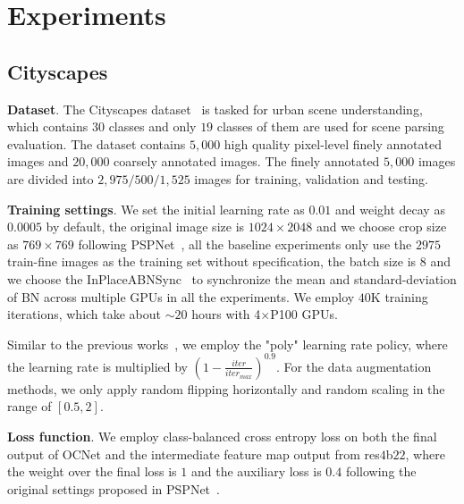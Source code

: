 \documentclass[10pt,twocolumn,letterpaper]{article}
\begin{document}
\section{Experiments}
\subsection{Cityscapes}

\noindent\textbf{Dataset}.
The Cityscapes dataset~\cite{cordts2016cityscapes} is tasked for urban scene understanding, which contains $30$ classes and only $19$ classes of them are used for scene parsing evaluation.
The dataset contains $5,000$ high quality pixel-level finely annotated images and $20,000$ coarsely annotated images. The finely annotated $5,000$ images are divided into $2,975/500/1,525$ images for training, validation and testing. 

\vspace{0.1cm}
\noindent\textbf{Training settings}.
We set the initial learning rate as $0.01$ and weight decay as $0.0005$ by default, the original image size is $1024\times 2048$ and we choose crop size as $769\times 769$ following PSPNet~\cite{zhao2017pyramid}, all the baseline experiments only use the $2975$ train-fine images as the training set without specification, the batch size is 8 and we choose the InPlaceABNSync~\cite{Bulò_2018_CVPR} to synchronize the mean and standard-deviation of BN across multiple GPUs in all the experiments. 
We employ $40$K training iterations, which take about $\sim20$ hours with 4$\times$P100 GPUs.

Similar to the previous works~\cite{chen2017rethinking}, we employ the "poly" learning rate policy, where the learning rate is multiplied by $(1-\frac{iter}{iter_{max}})^{0.9}$. 
For the data augmentation methods, we only apply random flipping horizontally and random scaling in the range of $[0.5, 2]$.

\vspace{0.1cm}
\noindent\textbf{Loss function}.
We employ class-balanced cross entropy loss on both the final output of OCNet and the intermediate feature map output from res$4$b$22$, where the weight over the final loss is $1$ and the auxiliary loss is $0.4$ following the original settings proposed in PSPNet~\cite{zhao2017pyramid}.
\end{document}
